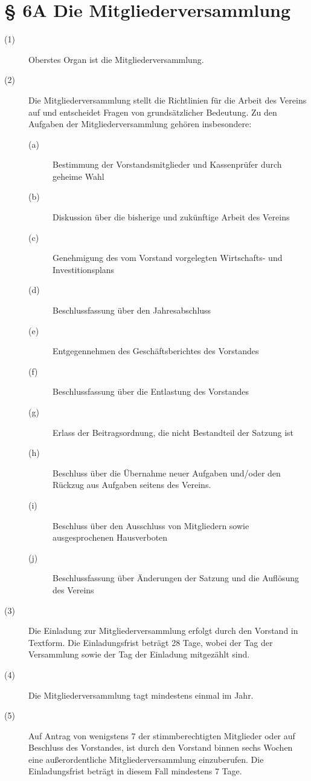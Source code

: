 \documentclass[a4paper,12pt]{scrartcl}
\begin{document}
\section*{\S{} 6A Die Mitgliederversammlung}
\begin{description} 

\item[(1)] Oberstes Organ ist die Mitgliederversammlung.
\item[(2)] Die Mitgliederversammlung stellt die Richtlinien für die Arbeit des Vereins auf und entscheidet Fragen von grundsätzlicher Bedeutung. Zu den Aufgaben der Mitgliederversammlung gehören insbesondere:
\begin{description} 
\item[(a)] Bestimmung der Vorstandsmitglieder und Kassenprüfer durch geheime Wahl
\item[(b)] Diskussion über die bisherige und zukünftige Arbeit des Vereins
\item[(c)] Genehmigung des vom Vorstand vorgelegten Wirtschafts- und Investitionsplans
\item[(d)] Beschlussfassung über den Jahresabschluss
\item[(e)] Entgegennehmen des Geschäftsberichtes des Vorstandes
\item[(f)] Beschlussfassung über die Entlastung des Vorstandes
\item[(g)] Erlass der Beitragsordnung, die nicht Bestandteil der Satzung ist
\item[(h)] Beschluss über die Übernahme neuer Aufgaben und/oder den Rückzug aus Aufgaben seitens des Vereins.
\item[(i)] Beschluss über den Ausschluss von Mitgliedern sowie ausgesprochenen Hausverboten
\item[(j)] Beschlussfassung über Änderungen der Satzung und die Auflösung des Vereins
\end{description}
\item[(3)] Die Einladung zur Mitgliederversammlung erfolgt durch den Vorstand in Textform. Die Einladungsfrist beträgt 28 Tage, wobei der Tag der Versammlung sowie der Tag der Einladung mitgezählt sind.
\item[(4)] Die Mitgliederversammlung tagt mindestens einmal im Jahr.
\item[(5)] Auf Antrag von wenigstens 7 der stimmberechtigten Mitglieder oder auf Beschluss des Vorstandes, ist durch den Vorstand binnen sechs Wochen eine außerordentliche Mitgliederversammlung einzuberufen. Die Einladungsfrist beträgt in diesem Fall mindestens 7 Tage.

\end{description}
\end{document}
